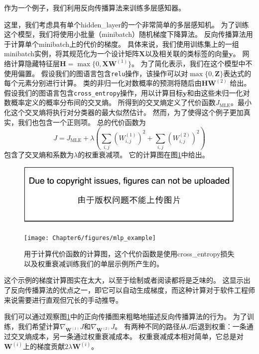 作为一个例子，我们利用反向传播算法来训练多层感知器。

这里，我们考虑具有单个\gls{hidden_layer}的一个非常简单的多层感知机。
为了训练这个模型，我们将使用小批量（minibatch）随机梯度下降算法。
反向传播算法用于计算单个minibatch上的代价的梯度。
具体来说，我们使用训练集上的一组minibatch实例，将其规范化为一个设计矩阵$\bm{X}$以及相关联的类标签的向量$\bm{y}$。
网络计算隐藏特征层$\bm{H}=\max\{0, \bm{X}\bm{W}^{(1)}\}$。
为了简化表示，我们在这个模型中不使用偏置。
假设我们的图语言包含\verb|relu|操作，该操作可以对$\max\{0,\bm{Z}\}$表达式的每个元素分别进行计算。
类的非归一化对数概率的预测将随后由$\bm{H}\bm{W}^{(2)}$ 给出。
假设我们的图语言包含\verb|cross_entropy|操作，用以计算目标$\bm{y}$和由这些未归一化对数概率定义的概率分布间的交叉熵。
所得到的交叉熵定义了代价函数$J_\text{MLE}$。最小化这个交叉熵将执行对分类器的最大似然估计。
然而，为了使得这个例子更加真实，我们也包含一个正则项。
总的代价函数为
\begin{equation}
  J = J_{\text{MLE}} + \lambda \left ( \sum_{i, j} \left (W_{i, j}^{(1)} \right )^2 + \sum_{i, j} \left (W_{i, j}^{(2)} \right)^2 \right )
\end{equation}
包含了交叉熵和系数为$\lambda$的权重衰减项。
它的计算图在图\ref{fig:chap6_mlp_example}中给出。
\begin{figure}[!htb]
\ifOpenSource
\centerline{\includegraphics{figure.pdf}}
\else
\centerline{\texttt{[image: Chapter6/figures/mlp\_example]}}
\fi
\caption{用于计算代价函数的计算图，这个代价函数是使用\gls{cross_entropy}损失以及权重衰减训练我们的单层示例所产生的。}
\label{fig:chap6_mlp_example}
\end{figure}

这个示例的梯度计算图实在太大，以至于绘制或者阅读都将是乏味的。
这显示出了反向传播算法的优点之一，即它可以自动生成梯度，而这种计算对于软件工程师来说需要进行直观但冗长的手动推导。

我们可以通过观察图\ref{fig:chap6_mlp_example}中的正向传播图来粗略地描述反向传播算法的行为。
为了训练，我们希望计算$\nabla_{\bm{W}^{(1)}} J$和$\nabla_{\bm{W}^{(2)}} J$。
有两种不同的路径从$J$后退到权重：一条通过交叉熵成本，另一条通过权重衰减成本。
权重衰减成本相对简单，它总是对$\bm{W}^{(i)}$上的梯度贡献$2\lambda \bm{W}^{(i)}$。
  
